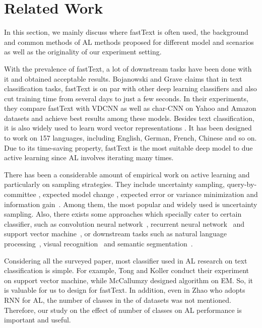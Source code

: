 \section{Related Work}
\label{sec:related}
In this section, we mainly discuss where fastText is often used, the background and common methods of AL methods proposed for different model and scenarios as well as the originality of our experiment setting.

With the prevalence of fastText, a lot of downstream tasks have been done with it and obtained acceptable results. Bojanowski and Grave  claims that in text classification tasks, fastText is on par with other deep learning classifiers and also cut training time from several days to just a few seconds. In their experiments, they compare fastText with VDCNN as well as char-CNN on Yahoo and Amazon datasets and achieve best results among these models. Besides text classification, it is also widely used to learn word vector representations \cite{bojanowski2017enriching}. It has been designed to work on 157 languages, including English, German, French, Chinese and so on. Due to its time-saving property, fastText is the most suitable deep model to due active learning since AL involves iterating many times. 

There has been a considerable amount of empirical work on active learning and
particularly on sampling strategies. They include uncertainty sampling, 
query-by-committee \cite{gilad2006query}, expected model change \cite{sznitman2010active}, 
expected error or variance minimization and information gain~\cite{joshi2012scalable}. 
Among them, the most popular and widely used is uncertainty sampling. 
Also, there exists some approaches which specially cater to certain classifier, 
such as convolution neural network~\cite{sener2017active}, 
recurrent neural network~\cite{zhao2017deep} and 
support vector machine~\cite{tong2001support}, 
or downstream tasks such as 
natural language processing~\cite{olsson2009literature}, 
visual recognition~\cite{luo2005active} and semantic segmentation~\cite{vezhnevets2012weakly}.

Considering all the surveyed paper, most classifier used in 
AL research on text classification is simple. 
For example, Tong and Koller  conduct 
their experiment on support vector machine, while McCallumzy  
designed algorithm on EM. So, it is valuable for us to design for fastText. 
In addition, even in Zhao  who adopts RNN for AL, 
the number of classes in the of datasets was not mentioned. Therefore, 
our study on the effect of number of classes on AL performance is important and
useful.
